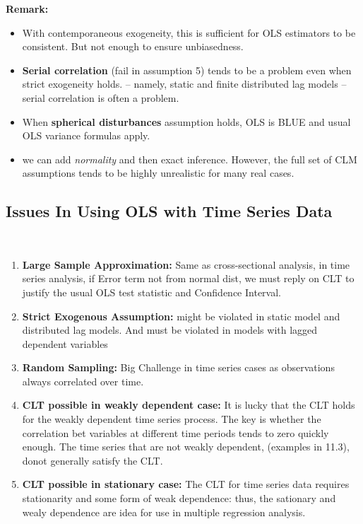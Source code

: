 \documentclass[12pt]{article}
\begin{document}
{\color{ForestGreen}\textbf{Remark: }} 
\begin{itemize}
\item
With contemporaneous exogeneity, this is sufficient for OLS estimators to be consistent. But not enough to ensure unbiasedness. 
\item
\textbf{Serial correlation} (fail in assumption 5) tends to be a problem even when strict exogeneity holds. – namely, static and finite distributed lag models – serial correlation is often a problem.
\item
When \textbf{spherical disturbances} assumption holds, OLS is BLUE and usual OLS variance formulas apply. 
\item
we can add \textit{normality} and then exact inference. However, the full set of CLM assumptions tends to be highly unrealistic for many real cases.

\end{itemize}


{\color{RoyalBlue}
\subsection{Issues In Using OLS with Time Series Data}}
\noindent
\color{purple} \\
\color{black}

\begin{enumerate}
\item \textbf{Large Sample Approximation:} Same as cross-sectional analysis, in time series analysis, if Error term not from normal dist, we must reply on CLT to justify the usual OLS test statistic and Confidence Interval. 
\item \textbf{Strict Exogenous Assumption:} might be violated in static model and distributed lag models. And must be violated in models with lagged dependent variables
\item \textbf{Random Sampling:} Big Challenge in time series cases as observations always correlated over time. 
\item \textbf{CLT possible in weakly dependent case: } It is lucky that the CLT holds for the weakly dependent time series process. The key is whether the correlation bet variables at different time periods tends to zero quickly enough. 
The time series that are not weakly dependent, (examples in 11.3), donot generally satisfy the CLT. 
\item \textbf{CLT possible in stationary case: } The CLT for time series data requires stationarity  and some form of weak dependence: thus, the sationary and wealy dependence are idea for use in multiple regression analysis. 

\end{enumerate}
\end{document}
